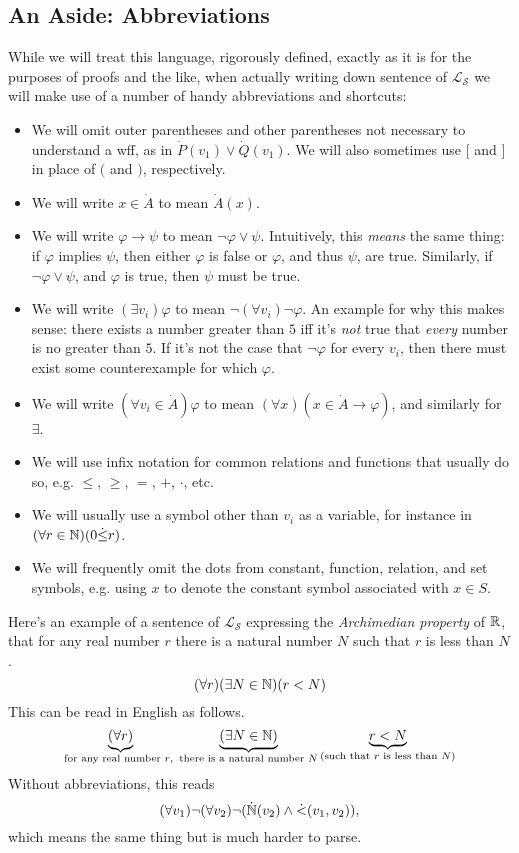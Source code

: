 \subsection{An Aside: Abbreviations}
While we will treat this language, rigorously defined, exactly as it is for the purposes of proofs and the like, when actually writing down sentence of $\mathcal{L}_\mathscr{S}$ we will make use of a number of handy abbreviations and shortcuts:
\begin{itemize}
    \item We will omit outer parentheses and other parentheses not necessary to understand a wff, as in $\dot P(v_1) \lor \dot Q(v_1)$. We will also sometimes use $[$ and $]$ in place of $($ and $)$, respectively.
    \item We will write $x \in \dot A$ to mean $\dot A(x)$.
    \item We will write $\varphi \to \psi$ to mean $\neg \varphi \lor \psi$. Intuitively, this \textit{means} the same thing: if $\varphi$ implies $\psi$, then either $\varphi$ is false or $\varphi$, and thus $\psi$, are true. Similarly, if $\neg \varphi \lor \psi$, and $\varphi$ is true, then $\psi$ must be true.
    \item We will write $(\exists v_i) \varphi$ to mean $\neg (\forall v_i) \neg \varphi$. An example for why this makes sense: there exists a number greater than $5$ iff it's \textit{not} true that \textit{every} number is no greater than $5$. If it's not the case that $\neg \varphi$ for every $v_i$, then there must exist some counterexample for which $\varphi$.
    \item We will write $(\forall v_i \in \dot A)\varphi$ to mean $(\forall x)(x \in \dot A \to \varphi)$, and similarly for $\exists$.
    \item We will use infix notation for common relations and functions that usually do so, e.g. $\leq$, $\geq$, $=$, $+$, $\cdot$, etc.
    \item We will usually use a symbol other than $v_i$ as a variable, for instance in $(\forall r \in \mathbb{N}) (0 \dot \leq r)$.
    \item We will frequently omit the dots from constant, function, relation, and set symbols, e.g. using $x$ to denote the constant symbol associated with $x \in S$.
\end{itemize}

Here's an example of a sentence of $\mathcal{L}_\mathscr{S}$ expressing the \textit{Archimedian property} of $\mathbb{R}$, that for any real number $r$ there is a natural number $N$ such that $r$ is less than $N$.
\[ (\forall r)(\exists N \in \mathbb{N})(r < N) \]
This can be read in English as follows.
\[ \underbrace{(\forall r)}_{\text{for any real number $r$,\ }}\underbrace{(\exists N \in \mathbb{N})}_{\text{there is a natural number $N$}}\underbrace{r < N}_{\text{(such that $r$ is less than $N$)}} \]
Without abbreviations, this reads
\[ (\forall v_1) \neg (\forall v_2) \neg (\dot {\mathbb{N}} (v_2) \land \dot <(v_1, v_2)), \]
which means the same thing but is much harder to parse.


